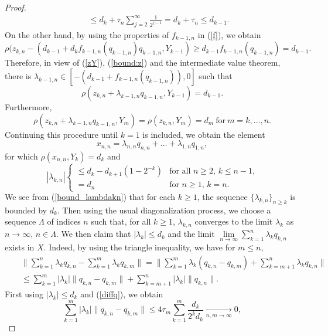 \documentclass[12pt, reqno]{amsart}
\theoremstyle{definition}
\theoremstyle{remark}
\numberwithin{equation}{section}
\begin{document}
\begin{proof}
\begin{eqnarray}
&&\le d_k+\tau_n\sum_{j=2}^\infty\frac{1}{2^{j-1}}= d_k+\tau_n\le d_{k-1}.
\end{eqnarray}
On the other hand, by using the properties of $f_{k-1,n}$ in (\ref{f}), we obtain
\begin{equation}
\label{bound:z}
\rho(z_{k,n}-(d_{k-1}+d_kf_{k-1,n}(q_{k-1,n})q_{k-1,n},Y_{k-1})\ge d_{k-1}f_{k-1,n}(q_{k-1,n})= d_{k-1}.
\end{equation}
Therefore, in view of (\ref{zY}), (\ref{bound:z}) and the intermediate value theorem, there is $\lambda_{k-1,n}\in [-(d_{k-1}+f_{k-1,n}(q_{k-1,n})),0]$ such that
$$
\rho(z_{k,n}+\lambda_{k-1,n}q_{k-1,n},Y_{k-1})=d_{k-1}.
$$
Furthermore,
$$
\rho(z_{k,n}+\lambda_{k-1,n}q_{k-1,n},Y_{m})=\rho(z_{k,n},Y_m)=d_{m}~\mbox{for}~m=k,\ldots,n.
$$
Continuing this procedure until $k=1$ is included, we obtain the element
$$
x_{n,n}=\lambda_{n,n}q_{n,n}+\ldots+\lambda_{1,n}q_{1,n},
$$
for which $\rho(x_{n,n},Y_k)=d_k$ and
\begin{equation}
\label{bound_lambdakn}
|\lambda_{k,n}|\left\{
\begin{array}{ll}
\le d_k-d_{k+1}(1-2^{-k})& \mbox{for all $n\ge2$, $k\le n-1$,}\\
=d_n&\mbox{for $n\ge1$, $k=n$.}
\end{array}\right.
 \end{equation}
We see from (\ref{bound_lambdakn}) that for each $k\ge1$, the sequence $\{\lambda_{k,n}\}_{n\ge k}$ is bounded by $d_k$. Then using the usual diagonalization process, we choose a sequence $\Lambda$ of indices $n$ such that, for all $k\ge1$, $\lambda_{k,n}$ converges to the limit $\lambda_k$ as $n\rightarrow\infty$, $n\in\Lambda$. We then claim that $|\lambda_k|\le d_k$ and the limit $\lim\limits_{n\rightarrow\infty}\sum\limits_{k=1}^n\lambda_kq_{k,n}$ exists in $X$. Indeed, by using the triangle inequality, we have for $m\le n$,
\begin{eqnarray}
\label{dfflambdaq}
&&\Big\|\sum_{k=1}^n\lambda_{k}q_{k,n}-\sum_{k=1}^m\lambda_{k}q_{k,m}\Big\|=\Big\|\sum_{k=1}^m\lambda_{k}(q_{k,n}-q_{k,m})+\sum_{k={m+1}}^n\lambda_{k}q_{k,n}\Big\|\nonumber\\
&&\le \sum_{k=1}^m|\lambda_{k}|\|q_{k,n}-q_{k,m}\|+\sum_{k={m+1}}^n|\lambda_{k}|\|q_{k,n}\|.
\end{eqnarray}
First using $|\lambda_k|\le d_k$ and (\ref{diffq}), we obtain
\begin{equation}
\label{dfflambdaq1}
\sum_{k=1}^m|\lambda_{k}|\|q_{k,n}-q_{k,m}\|\le 4\tau_m\sum_{k=1}^m\frac{d_k}{2^kd_k}\xrightarrow[n,m\rightarrow\infty]{}0,

\end{equation}
\end{proof}
\end{document}
